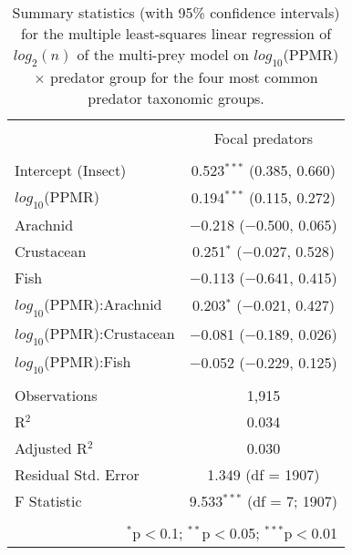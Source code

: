 
\begin{table}[!htbp] \centering 
  \caption{Summary statistics (with 95\% confidence intervals) for the multiple least-squares linear regression of $log_2(n)$ of the multi-prey model on $log_{10}$(PPMR) $\times$ predator group for the four most common predator taxonomic groups.} 
  \label{tab:n-ppmr_byPred} 
\begin{tabular}{@{\extracolsep{5pt}}lc} 
\\[-1.8ex]\hline 
\hline \\[-1.8ex] 
 & \multicolumn{1}{c}{Focal predators} \\ 
\cline{2-2} 
\hline \\[-1.8ex] 
 Intercept (Insect) & 0.523$^{***}$ (0.385, 0.660) \\ 
  $log_{10}$(PPMR) & 0.194$^{***}$ (0.115, 0.272) \\ 
  Arachnid & $-$0.218 ($-$0.500, 0.065) \\ 
  Crustacean & 0.251$^{*}$ ($-$0.027, 0.528) \\ 
  Fish & $-$0.113 ($-$0.641, 0.415) \\ 
  $log_{10}$(PPMR):Arachnid & 0.203$^{*}$ ($-$0.021, 0.427) \\ 
  $log_{10}$(PPMR):Crustacean & $-$0.081 ($-$0.189, 0.026) \\ 
  $log_{10}$(PPMR):Fish & $-$0.052 ($-$0.229, 0.125) \\ 
 \hline \\[-1.8ex] 
Observations & 1,915 \\ 
R$^{2}$ & 0.034 \\ 
Adjusted R$^{2}$ & 0.030 \\ 
Residual Std. Error & 1.349 (df = 1907) \\ 
F Statistic & 9.533$^{***}$ (df = 7; 1907) \\ 
\hline 
\hline \\[-1.8ex] 
\multicolumn{2}{r}{$^{*}$p$<$0.1; $^{**}$p$<$0.05; $^{***}$p$<$0.01} \\ 
\end{tabular} 
\end{table} 
